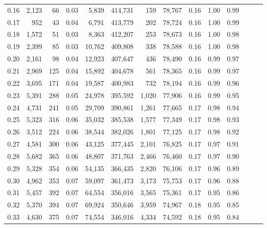 \begin{tabular}{rrrrrrrrrrrrrr}
0.16 &   2,123 &     66 &  0.03 &    5,839 &  414,731 &     159 &  78,767 &  0.16 &  1.00 &      0.99 \\
0.17 &     952 &     43 &  0.04 &    6,791 &  413,779 &     202 &  78,724 &  0.16 &  1.00 &      0.99 \\
0.18 &   1,572 &     51 &  0.03 &    8,363 &  412,207 &     253 &  78,673 &  0.16 &  1.00 &      0.98 \\
0.19 &   2,399 &     85 &  0.03 &   10,762 &  409,808 &     338 &  78,588 &  0.16 &  1.00 &      0.98 \\
0.20 &   2,161 &     98 &  0.04 &   12,923 &  407,647 &     436 &  78,490 &  0.16 &  0.99 &      0.97 \\
0.21 &   2,969 &    125 &  0.04 &   15,892 &  404,678 &     561 &  78,365 &  0.16 &  0.99 &      0.97 \\
0.22 &   3,695 &    171 &  0.04 &   19,587 &  400,983 &     732 &  78,194 &  0.16 &  0.99 &      0.96 \\
0.23 &   5,391 &    288 &  0.05 &   24,978 &  395,592 &   1,020 &  77,906 &  0.16 &  0.99 &      0.95 \\
0.24 &   4,731 &    241 &  0.05 &   29,709 &  390,861 &   1,261 &  77,665 &  0.17 &  0.98 &      0.94 \\
0.25 &   5,323 &    316 &  0.06 &   35,032 &  385,538 &   1,577 &  77,349 &  0.17 &  0.98 &      0.93 \\
0.26 &   3,512 &    224 &  0.06 &   38,544 &  382,026 &   1,801 &  77,125 &  0.17 &  0.98 &      0.92 \\
0.27 &   4,581 &    300 &  0.06 &   43,125 &  377,445 &   2,101 &  76,825 &  0.17 &  0.97 &      0.91 \\
0.28 &   5,682 &    365 &  0.06 &   48,807 &  371,763 &   2,466 &  76,460 &  0.17 &  0.97 &      0.90 \\
0.29 &   5,328 &    354 &  0.06 &   54,135 &  366,435 &   2,820 &  76,106 &  0.17 &  0.96 &      0.89 \\
0.30 &   4,962 &    353 &  0.07 &   59,097 &  361,473 &   3,173 &  75,753 &  0.17 &  0.96 &      0.88 \\
0.31 &   5,457 &    392 &  0.07 &   64,554 &  356,016 &   3,565 &  75,361 &  0.17 &  0.95 &      0.86 \\
0.32 &   5,370 &    394 &  0.07 &   69,924 &  350,646 &   3,959 &  74,967 &  0.18 &  0.95 &      0.85 \\
0.33 &   4,630 &    375 &  0.07 &   74,554 &  346,016 &   4,334 &  74,592 &  0.18 &  0.95 &      0.84 \\

\end{tabular}
